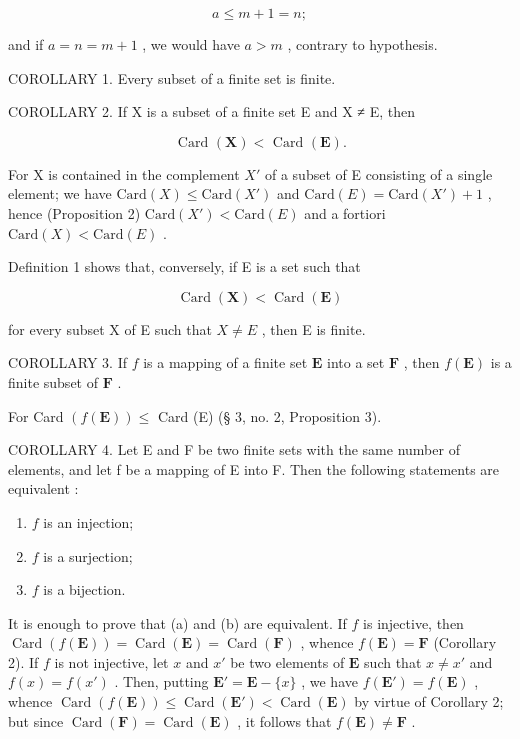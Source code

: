 \[
a \leqslant m + 1 = n;
\]

and if \(a = n = m + 1\) , we would have \(a > m\) , contrary to hypothesis.

COROLLARY 1. Every subset of a finite set is finite.

COROLLARY 2. If X is a subset of a finite set E and X ≠ E, then

\[
\text { Card } (\mathbf {X}) <   \text { Card } (\mathbf {E}).
\]

For X is contained in the complement \(X'\) of a subset of E consisting of a single element; we have \(\text{Card}(X) \leqslant \text{Card}(X')\) and \(\text{Card}(E) = \text{Card}(X') + 1\) , hence (Proposition 2) \(\text{Card}(X') < \text{Card}(E)\) and a fortiori \(\text{Card}(X) < \text{Card}(E)\) .

Definition 1 shows that, conversely, if E is a set such that

\[
\operatorname{Card} (\mathbf {X}) <   \operatorname{Card} (\mathbf {E})
\]

for every subset X of E such that \(X \neq E\) , then E is finite.

COROLLARY 3. If \(f\) is a mapping of a finite set \(\mathbf{E}\) into a set \(\mathbf{F}\) , then \(f(\mathbf{E})\) is a finite subset of \(\mathbf{F}\) .

For Card \((f(\mathbf{E}))\leqslant\) Card (E) (§ 3, no. 2, Proposition 3).

COROLLARY 4. Let E and F be two finite sets with the same number of elements, and let f be a mapping of E into F. Then the following statements are equivalent :

\begin{enumerate}
\def\labelenumi{(\alph{enumi})}
\item
  \(f\) is an injection;
\item
  \(f\) is a surjection;
\item
  \(f\) is a bijection.
\end{enumerate}

It is enough to prove that (a) and (b) are equivalent. If \(f\) is injective, then \(\operatorname{Card}(f(\mathbf{E})) = \operatorname{Card}(\mathbf{E}) = \operatorname{Card}(\mathbf{F})\) , whence \(f(\mathbf{E}) = \mathbf{F}\) (Corollary 2). If \(f\) is not injective, let \(x\) and \(x'\) be two elements of \(\mathbf{E}\) such that \(x \neq x'\) and \(f(x) = f(x')\) . Then, putting \(\mathbf{E}' = \mathbf{E} - \{x\}\) , we have \(f(\mathbf{E}') = f(\mathbf{E})\) , whence \(\operatorname{Card}(f(\mathbf{E})) \leqslant \operatorname{Card}(\mathbf{E}') < \operatorname{Card}(\mathbf{E})\) by virtue of Corollary 2; but since \(\operatorname{Card}(\mathbf{F}) = \operatorname{Card}(\mathbf{E})\) , it follows that \(f(\mathbf{E}) \neq \mathbf{F}\) .

